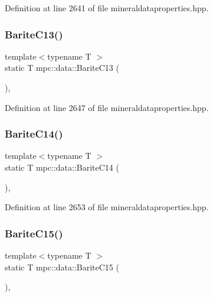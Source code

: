 Definition at line 2641 of file mineraldataproperties.\+hpp.

\mbox{\label{namespacempc_1_1data_aa7158eb57a531fa0a4e5a465551f8953}} 
\subsubsection{\texorpdfstring{Barite\+C13()}{BariteC13()}}
{\footnotesize\ttfamily template$<$typename T $>$ \\
static T mpc\+::data\+::\+Barite\+C13 (\begin{DoxyParamCaption}{ }\end{DoxyParamCaption})\hspace{0.3cm}{\ttfamily [inline]}, {\ttfamily [static]}}



Definition at line 2647 of file mineraldataproperties.\+hpp.

\mbox{\label{namespacempc_1_1data_a2677f52e6f490051560d9b3db115c402}} 
\subsubsection{\texorpdfstring{Barite\+C14()}{BariteC14()}}
{\footnotesize\ttfamily template$<$typename T $>$ \\
static T mpc\+::data\+::\+Barite\+C14 (\begin{DoxyParamCaption}{ }\end{DoxyParamCaption})\hspace{0.3cm}{\ttfamily [inline]}, {\ttfamily [static]}}



Definition at line 2653 of file mineraldataproperties.\+hpp.

\mbox{\label{namespacempc_1_1data_aaa19b9ed6cfd15ed7aacbc66263e6b62}} 
\subsubsection{\texorpdfstring{Barite\+C15()}{BariteC15()}}
{\footnotesize\ttfamily template$<$typename T $>$ \\
static T mpc\+::data\+::\+Barite\+C15 (\begin{DoxyParamCaption}{ }\end{DoxyParamCaption})\hspace{0.3cm}{\ttfamily [inline]}, {\ttfamily [static]}}



